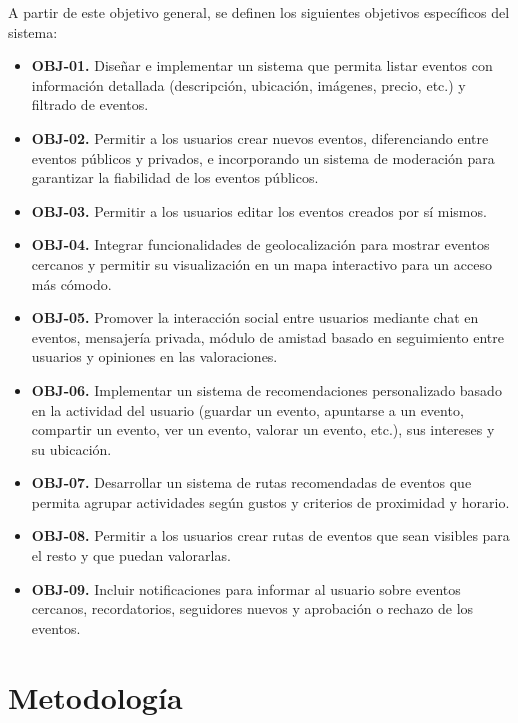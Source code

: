 A partir de este objetivo general, se definen los siguientes objetivos específicos del sistema:

\begin{itemize}
    \item \textbf{OBJ-01.} Diseñar e implementar un sistema que permita listar eventos con información detallada (descripción, ubicación, imágenes, precio, etc.) y filtrado de eventos.

    \item \textbf{OBJ-02.} Permitir a los usuarios crear nuevos eventos, diferenciando entre eventos públicos y privados, e incorporando un sistema de moderación para garantizar la fiabilidad de los eventos públicos.

    \item \textbf{OBJ-03.} Permitir a los usuarios editar los eventos creados por sí mismos.

    \item \textbf{OBJ-04.} Integrar funcionalidades de geolocalización para mostrar eventos cercanos y permitir su visualización en un mapa interactivo para un acceso más cómodo.

    \item \textbf{OBJ-05.} Promover la interacción social entre usuarios mediante chat en eventos, mensajería privada, módulo de amistad basado en seguimiento entre usuarios y opiniones en las valoraciones.

    \item \textbf{OBJ-06.} Implementar un sistema de recomendaciones personalizado basado en la actividad del usuario (guardar un evento, apuntarse a un evento, compartir un evento, ver un evento, valorar un evento, etc.), sus intereses y su ubicación.

    \item \textbf{OBJ-07.} Desarrollar un sistema de rutas recomendadas de eventos que permita agrupar actividades según gustos y criterios de proximidad y horario.

    \item \textbf{OBJ-08.} Permitir a los usuarios crear rutas de eventos que sean visibles para el resto y que puedan valorarlas.

    \item \textbf{OBJ-09.} Incluir notificaciones para informar al usuario sobre eventos cercanos, recordatorios, seguidores nuevos y aprobación o rechazo de los eventos.
\end{itemize}

\section{Metodología}

